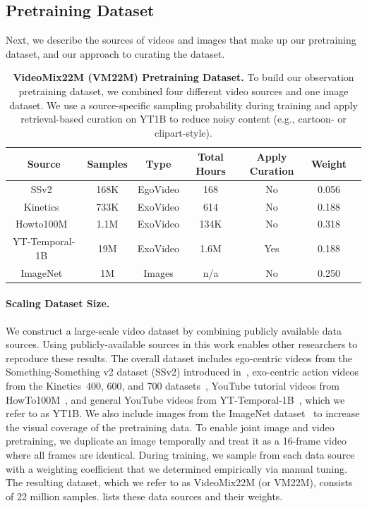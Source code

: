 \documentclass[]{fairmeta}
\begin{document}
\subsection{Pretraining Dataset}
\label{subsec:pretraining_dataset}

Next, we describe the sources of videos and images that make up our pretraining dataset, and our approach to curating the dataset.
\begin{table}[t!]
    \centering
    \small
    \caption{
      \textbf{VideoMix22M (VM22M) Pretraining Dataset.}
      To build our observation pretraining dataset, we combined four different video sources and one image dataset. We use a source-specific sampling probability during training and apply retrieval-based curation on YT1B to reduce noisy content (e.g., cartoon- or clipart-style).}
    \begin{tabular}{ccccccc}
    \toprule
    Source & Samples & Type & Total Hours &  Apply Curation  & Weight\\
    \midrule
    SSv2~\citep{goyal2017something} & 168K & EgoVideo  & 168 & No & 0.056\\
    Kinetics~\citep{carreira2019short} & 733K & ExoVideo  & 614 & No & 0.188\\
    Howto100M~\citep{miech2019howto100m} & 1.1M & ExoVideo  & 134K & No & 0.318\\
    YT-Temporal-1B~\citep{zellers2022merlot} & 19M & ExoVideo  & 1.6M & Yes & 0.188\\
    ImageNet~\citep{deng2009imagenet} & 1M & Images  & n/a & No & 0.250\\
    \end{tabular}
    \label{table:pretraining_dataset}
\end{table}

\paragraph{\bf Scaling Dataset Size.}
We construct a large-scale video dataset by combining publicly available data sources. Using publicly-available sources in this work enables other researchers to reproduce these results. The overall dataset includes ego-centric videos from the Something-Something v2 dataset (SSv2) introduced in~\citet{goyal2017something}, exo-centric action videos from the Kinetics~400, 600, and 700 datasets~\citep{kay2017kinetics, carreira2018short, carreira2019short}, YouTube tutorial videos from HowTo100M~\citep{miech2019howto100m}, and general YouTube videos from YT-Temporal-1B~\citep{zellers2022merlot}, which we refer to as YT1B. We also include images from the ImageNet dataset~\citep{deng2009imagenet} to increase the visual coverage of the pretraining data.
To enable joint image and video pretraining, we duplicate an image temporally and treat it as a 16-frame video where all frames are identical. During training, we sample from each data source with a weighting coefficient that we determined empirically via manual tuning. The resulting dataset, which we refer to as VideoMix22M (or VM22M), consists of 22 million samples.  lists these data sources and their weights.
\end{document}

